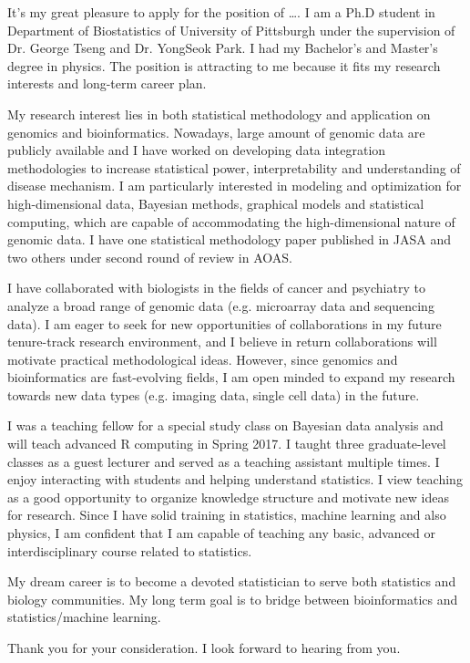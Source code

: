 \documentclass[10pt,stdletter,orderfromtodate]{newlfm}
\begin{document}
\begin{newlfm}

It's my great pleasure to apply for the position of \ldots{}.
I am a Ph.D student in Department of Biostatistics of University of Pittsburgh
under the supervision of Dr. George Tseng and Dr. YongSeok Park.
I had my Bachelor's and Master's degree in physics.
The position is attracting to me because it fits my research interests and long-term career plan.

My research interest lies in both statistical methodology and application on genomics and bioinformatics.
Nowadays, large amount of genomic data are publicly available and
I have worked on developing data integration methodologies to increase statistical power, interpretability and understanding of disease mechanism. 
I am particularly interested in modeling and optimization for high-dimensional data, Bayesian methods, graphical models and statistical computing,
which are capable of accommodating the high-dimensional nature of genomic data.
I have one statistical methodology paper published in JASA and two others under second round of review in AOAS.

I have collaborated with biologists in the fields of cancer and psychiatry to analyze a broad range of genomic data (e.g. microarray data and sequencing data).
I am eager to seek for new opportunities of collaborations in my future tenure-track research environment, 
and I believe in return collaborations will motivate practical methodological ideas.
However, since genomics and bioinformatics are fast-evolving fields,
I am open minded to expand my research towards new data types (e.g. imaging data, single cell data) in the future.

I was a teaching fellow for a special study class on Bayesian data analysis and will teach advanced R computing in Spring 2017.
I taught three graduate-level classes as a guest lecturer and served as a teaching assistant multiple times.
I enjoy interacting with students and helping understand statistics.
I view teaching as a good opportunity to organize knowledge structure and motivate new ideas for research. 
Since I have solid training in statistics, machine learning and also physics, 
I am confident that I am capable of teaching any basic, advanced or interdisciplinary course related to statistics.

My dream career is to become a devoted statistician to serve both statistics and biology communities.
My long term goal is to bridge between bioinformatics and statistics/machine learning.


Thank you for your consideration.  
I look forward to hearing from you.

\end{newlfm}
\end{document}
